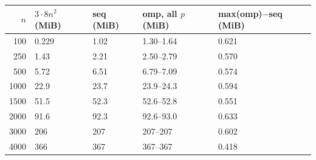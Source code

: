 \begin{tabular}{rllll}
\toprule
$n$ & $3\cdot 8n^2$ (MiB) & seq (MiB) & omp, all $p$ (MiB) & max(omp)$-$seq (MiB) \\
\midrule
100 & 0.229 & 1.02 & 1.30--1.64 & 0.621 \\
250 & 1.43 & 2.21 & 2.50--2.79 & 0.570 \\
500 & 5.72 & 6.51 & 6.79--7.09 & 0.574 \\
1000 & 22.9 & 23.7 & 23.9--24.3 & 0.594 \\
1500 & 51.5 & 52.3 & 52.6--52.8 & 0.551 \\
2000 & 91.6 & 92.3 & 92.6--93.0 & 0.633 \\
3000 & 206 & 207 & 207--207 & 0.602 \\
4000 & 366 & 367 & 367--367 & 0.418 \\
\bottomrule
\end{tabular}
